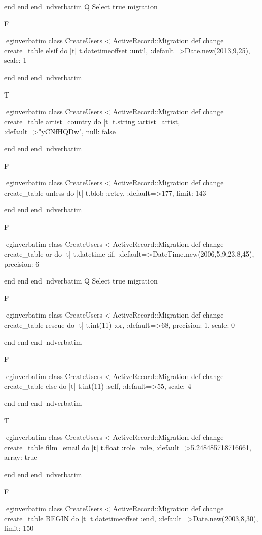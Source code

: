     end 
  end 
end
nd{verbatim}
Q
 Select true migration

F

egin{verbatim}
 class CreateUsers < ActiveRecord::Migration 
  def change 
    create_table elsif do |t| 
      t.datetimeoffset :until, :default=>Date.new(2013,9,25), scale: 1
    
    end 
  end 
end
nd{verbatim}

T

egin{verbatim}
 class CreateUsers < ActiveRecord::Migration 
  def change 
    create_table artist_country do |t| 
      t.string :artist_artist, :default=>"yCNfHQDw", null: false
    
    end 
  end 
end
nd{verbatim}

F

egin{verbatim}
 class CreateUsers < ActiveRecord::Migration 
  def change 
    create_table unless do |t| 
      t.blob :retry, :default=>177, limit: 143
    
    end 
  end 
end
nd{verbatim}

F

egin{verbatim}
 class CreateUsers < ActiveRecord::Migration 
  def change 
    create_table or do |t| 
      t.datetime :if, :default=>DateTime.new(2006,5,9,23,8,45), precision: 6
    
    end 
  end 
end
nd{verbatim}
Q
 Select true migration

F

egin{verbatim}
 class CreateUsers < ActiveRecord::Migration 
  def change 
    create_table rescue do |t| 
      t.int(11) :or, :default=>68, precision: 1, scale: 0
    
    end 
  end 
end
nd{verbatim}

F

egin{verbatim}
 class CreateUsers < ActiveRecord::Migration 
  def change 
    create_table else do |t| 
      t.int(11) :self, :default=>55, scale: 4
    
    end 
  end 
end
nd{verbatim}

T

egin{verbatim}
 class CreateUsers < ActiveRecord::Migration 
  def change 
    create_table film_email do |t| 
      t.float :role_role, :default=>5.248485718716661, array: true
    
    end 
  end 
end
nd{verbatim}

F

egin{verbatim}
 class CreateUsers < ActiveRecord::Migration 
  def change 
    create_table BEGIN do |t| 
      t.datetimeoffset :end, :default=>Date.new(2003,8,30), limit: 150
    
